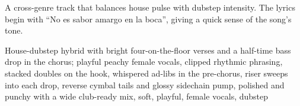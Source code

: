 

\begin{notes}
A cross-genre track that balances house pulse with dubstep intensity. %
The lyrics begin with “No es sabor amargo en la boca”, giving a quick sense of the song’s tone.
\end{notes}

\begin{style}
House-dubstep hybrid with bright four-on-the-floor verses and a half-time bass drop in the chorus; playful peachy female vocals, clipped rhythmic phrasing, stacked doubles on the hook, whispered ad-libs in the pre-chorus, riser sweeps into each drop, reverse cymbal tails and glossy sidechain pump, polished and punchy with a wide club-ready mix, soft, playful, female vocals, dubstep
\end{style}

